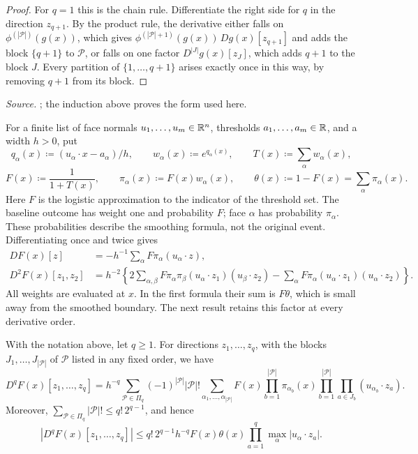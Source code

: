 \begin{proof}
For \(q=1\) this is the chain rule. Differentiate the right side for \(q\)
in the direction \(z_{q+1}\). By the product rule, the derivative either
falls on \(\phi^{(|\mathcal P|)}(g(x))\), which gives
\(\phi^{(|\mathcal P|+1)}(g(x))\,Dg(x)[z_{q+1}]\) and adds the block
\(\{q+1\}\) to \(\mathcal P\), or falls on one factor
\(D^{|J|}g(x)[z_J]\), which adds \(q+1\) to the block \(J\). Every partition
of \(\{1,\ldots,q+1\}\) arises exactly once in this way, by removing
\(q+1\) from its block.
\end{proof}

\emph{Source.} ; the induction above proves the form used here.

For a finite list of face normals \(u_1,\ldots,u_m\in\mathbb R^n\), thresholds
\(a_1,\ldots,a_m\in\mathbb R\), and a width \(h>0\), put
\[
 q_\alpha(x)\coloneqq(u_\alpha\cdot x-a_\alpha)/h,\qquad
 w_\alpha(x)\coloneqq e^{q_\alpha(x)},\qquad T(x)\coloneqq\sum_\alpha w_\alpha(x),
\]
\[
 F(x)\coloneqq\frac1{1+T(x)},\qquad
 \pi_\alpha(x)\coloneqq F(x)w_\alpha(x),\qquad
 \theta(x)\coloneqq1-F(x)=\sum_\alpha\pi_\alpha(x).
\]
Here \(F\) is the logistic approximation to the indicator of the
threshold set. The baseline outcome has weight one and probability
\(F\); face \(\alpha\) has probability \(\pi_\alpha\). These
probabilities describe the smoothing formula, not the original event.
Differentiating once and twice gives
\begin{align*}
 DF(x)[z]&=-h^{-1}\sum_\alpha F\pi_\alpha(u_\alpha\cdot z),\\
 D^2F(x)[z_1,z_2]
 &=h^{-2}\left\{2\sum_{\alpha,\beta}F\pi_\alpha\pi_\beta
       (u_\alpha\cdot z_1)(u_\beta\cdot z_2)
       -\sum_\alpha F\pi_\alpha
       (u_\alpha\cdot z_1)(u_\alpha\cdot z_2)\right\}.
\end{align*}
All weights are evaluated at \(x\). In the first formula their sum is
\(F\theta\), which is small away from the smoothed boundary.
The next result retains this factor at every derivative order.

\begin{fact}\label{tb:logistic}
With the notation above, let \(q\ge1\).
For directions \(z_1,\ldots,z_q\), with the blocks \(J_1,\ldots,J_{|\mathcal P|}\)
of \(\mathcal P\) listed in any fixed order, we have
\[
 D^qF(x)[z_1,\ldots,z_q]
 =h^{-q}\sum_{\mathcal P\in\Pi_q}(-1)^{|\mathcal P|}|\mathcal P|!
 \sum_{\alpha_1,\ldots,\alpha_{|\mathcal P|}}
 F(x)\prod_{b=1}^{|\mathcal P|}\pi_{\alpha_b}(x)
 \prod_{b=1}^{|\mathcal P|}\prod_{a\in J_b}(u_{\alpha_b}\cdot z_a).
\]
Moreover, \(\sum_{\mathcal P\in\Pi_q}|\mathcal P|!\le q!\,2^{q-1}\), and hence
\[
 |D^qF(x)[z_1,\ldots,z_q]|
 \le q!\,2^{q-1}h^{-q}F(x)\theta(x)
       \prod_{a=1}^q\max_\alpha|u_\alpha\cdot z_a|.
\]
\end{fact}

